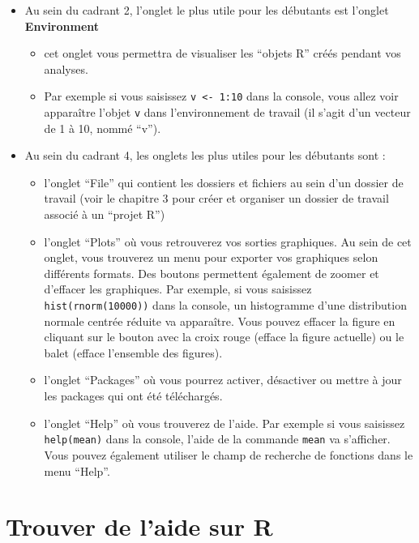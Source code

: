 \documentclass[
]{book}
\providecommand{\tightlist}{%
  \setlength{\itemsep}{0pt}\setlength{\parskip}{0pt}}
\begin{document}
\begin{itemize}
\tightlist
\item
  Au sein du cadrant 2, l'onglet le plus utile pour les débutants est l'onglet \textbf{Environment}

  \begin{itemize}
  \tightlist
  \item
    cet onglet vous permettra de visualiser les ``objets R'' créés pendant vos analyses.
  \item
    Par exemple si vous saisissez \texttt{v\ \textless{}-\ 1:10} dans la console, vous allez voir apparaître l'objet \texttt{v} dans l'environnement de travail (il s'agit d'un vecteur de 1 à 10, nommé ``v'').
  \end{itemize}
\item
  Au sein du cadrant 4, les onglets les plus utiles pour les débutants sont :

  \begin{itemize}
  \tightlist
  \item
    l'onglet ``File'' qui contient les dossiers et fichiers au sein d'un dossier de travail (voir le chapitre 3 pour créer et organiser un dossier de travail associé à un ``projet R'')
  \item
    l'onglet ``Plots'' où vous retrouverez vos sorties graphiques. Au sein de cet onglet, vous trouverez un menu pour exporter vos graphiques selon différents formats. Des boutons permettent également de zoomer et d'effacer les graphiques. Par exemple, si vous saisissez \texttt{hist(rnorm(10000))} dans la console, un histogramme d'une distribution normale centrée réduite va apparaître. Vous pouvez effacer la figure en cliquant sur le bouton avec la croix rouge (efface la figure actuelle) ou le balet (efface l'ensemble des figures).
  \item
    l'onglet ``Packages'' où vous pourrez activer, désactiver ou mettre à jour les packages qui ont été téléchargés.
  \item
    l'onglet ``Help'' où vous trouverez de l'aide. Par exemple si vous saisissez \texttt{help(mean)} dans la console, l'aide de la commande \texttt{mean} va s'afficher. Vous pouvez également utiliser le champ de recherche de fonctions dans le menu ``Help''.
  \end{itemize}
\end{itemize}

\section{Trouver de l'aide sur R}\label{trouver-de-laide-sur-r}
\end{document}
